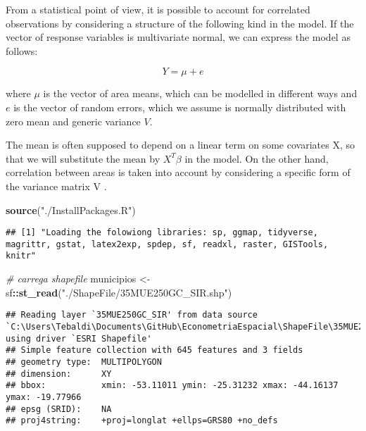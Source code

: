 \documentclass[]{article}
\newenvironment{Shaded}{\begin{snugshade}}{\end{snugshade}}
\newcommand{\KeywordTok}[1]{\textcolor[rgb]{0.13,0.29,0.53}{\textbf{#1}}}
\newcommand{\StringTok}[1]{\textcolor[rgb]{0.31,0.60,0.02}{#1}}
\newcommand{\CommentTok}[1]{\textcolor[rgb]{0.56,0.35,0.01}{\textit{#1}}}
\newcommand{\OperatorTok}[1]{\textcolor[rgb]{0.81,0.36,0.00}{\textbf{#1}}}
\newcommand{\NormalTok}[1]{#1}
\begin{document}
From a statistical point of view, it is possible to account for
correlated observations by considering a structure of the following kind
in the model. If the vector of response variables is multivariate
normal, we can express the model as follows:

\begin{equation}
Y = \mu +e
\end{equation}

where \(\mu\) is the vector of area means, which can be modelled in
different ways and \(e\) is the vector of random errors, which we assume
is normally distributed with zero mean and generic variance \(V\).

The mean is often supposed to depend on a linear term on some covariates
X, so that we will substitute the mean by \(X^T\beta\) in the model. On
the other hand, correlation between areas is taken into account by
considering a specific form of the variance matrix V .

\begin{Shaded}
\begin{Highlighting}[]
\KeywordTok{source}\NormalTok{(}\StringTok{"./InstallPackages.R"}\NormalTok{)}
\end{Highlighting}
\end{Shaded}

\begin{verbatim}
## [1] "Loading the folowiong libraries: sp, ggmap, tidyverse, magrittr, gstat, latex2exp, spdep, sf, readxl, raster, GISTools, knitr"
\end{verbatim}

\begin{Shaded}
\begin{Highlighting}[]
\CommentTok{# carrega shapefile}
\NormalTok{municipios <-}\StringTok{ }\NormalTok{sf}\OperatorTok{::}\KeywordTok{st_read}\NormalTok{(}\StringTok{"./ShapeFile/35MUE250GC_SIR.shp"}\NormalTok{)}
\end{Highlighting}
\end{Shaded}

\begin{verbatim}
## Reading layer `35MUE250GC_SIR' from data source `C:\Users\Tebaldi\Documents\GitHub\EconometriaEspacial\ShapeFile\35MUE250GC_SIR.shp' using driver `ESRI Shapefile'
## Simple feature collection with 645 features and 3 fields
## geometry type:  MULTIPOLYGON
## dimension:      XY
## bbox:           xmin: -53.11011 ymin: -25.31232 xmax: -44.16137 ymax: -19.77966
## epsg (SRID):    NA
## proj4string:    +proj=longlat +ellps=GRS80 +no_defs
\end{verbatim}
\end{document}
